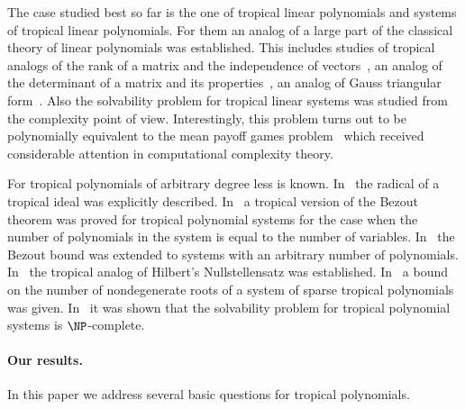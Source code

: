 \documentclass[11pt]{article}
\begin{document}
The case studied best so far is the one of tropical linear polynomials and systems of tropical linear polynomials.
For them an analog of a large part of the classical theory of linear polynomials was established.
This includes studies of tropical analogs of the rank of a matrix and the independence of vectors~\cite{DSS05rank,IzhakianR2009rank,AkianGG09rank},
an analog of the determinant of a matrix and its properties~\cite{AkianGG09rank,DSS05rank,Grigoriev13complexity}, an analog of Gauss triangular form~\cite{Grigoriev13complexity}. Also the solvability problem for tropical linear systems was studied from the complexity point of view.
Interestingly, this problem turns out to be polynomially equivalent to the mean payoff games problem~\cite{akian12mean_payoff,GP13Complexity} which received considerable attention in computational complexity theory.

For tropical polynomials of arbitrary degree less is known. In~\cite{IzhakianS07} the radical of a tropical
ideal was explicitly described.
In~\cite{RGST05first_steps,ST10SIAM} a tropical version of the Bezout theorem was proved for tropical polynomial systems for the case when the number of polynomials in the system is equal to the number of variables.
In~\cite{DavydowG16} the Bezout bound was extended to systems with an arbitrary
number of polynomials.
In~\cite{GrigorievP18} the tropical analog of Hilbert's Nullstellensatz was established.
In~\cite{Bihan16} a bound on the number of nondegenerate roots of a system of sparse tropical polynomials was given.
In~\cite{theobald06frontiers} it was shown that the solvability problem for tropical polynomial systems is $\NP$-complete.

\paragraph{Our results.} In this paper we address several basic questions for tropical polynomials.
\end{document}
